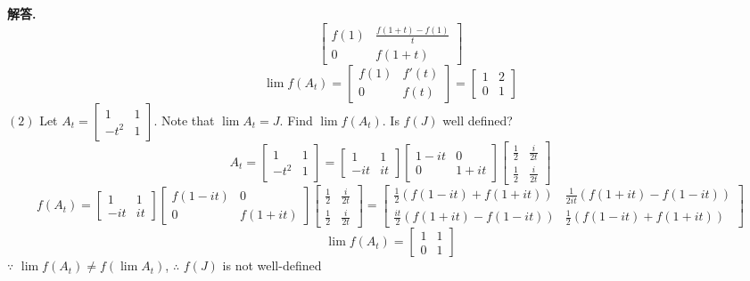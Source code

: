 \documentclass[12pt, a4paper, oneside]{article}
\newenvironment{solution}{\par\noindent\textbf{解答. }}{\par}
\begin{document}
\begin{CJK}{UTF8}{gbsn}
\begin{solution}
$$\begin{bmatrix}
        f(1) & \frac{f(1+t) - f(1)}{t} \\ 0 & f(1 + t)
      \end{bmatrix}
    $$
    $$
      \lim{f(A_t)} = \begin{bmatrix}
        f(1) & f'(t) \\ 0 & f(t)
      \end{bmatrix} = \begin{bmatrix}
        1 & 2 \\ 0 & 1
      \end{bmatrix}
    $$
    $(2)$ Let $A_t = \begin{bmatrix}
      1 & 1 \\ -t^2 & 1
    \end{bmatrix}$. Note that $\lim{A_t} = J$. Find $\lim{f(A_t)}$. Is $f(J)$ well defined? \newline
    $$
      A_t = \begin{bmatrix}
        1 & 1 \\ -t^2 & 1
      \end{bmatrix} = \begin{bmatrix}
        1 & 1 \\ -it & it  
      \end{bmatrix} \begin{bmatrix}
        1 - it & 0 \\ 0 & 1 + it
      \end{bmatrix} \begin{bmatrix}
        \frac{1}{2} & \frac{i}{2t} \\ \frac{1}{2} & \frac{i}{2t}
      \end{bmatrix}
    $$ 
    $$ 
      f(A_t) =  \begin{bmatrix}
        1 & 1 \\ -it & it  
      \end{bmatrix} \begin{bmatrix}
        f(1 - it) & 0 \\ 0 & f(1 + it)
      \end{bmatrix} \begin{bmatrix}
        \frac{1}{2} & \frac{i}{2t} \\ \frac{1}{2} & \frac{i}{2t}
      \end{bmatrix} = \begin{bmatrix}
        \frac{1}{2}(f(1-it) + f(1+it)) & \frac{1}{2it}(f(1+it) - f(1-it)) \\  \frac{it}{2}(f(1+it) - f(1-it)) & \frac{1}{2}(f(1-it) + f(1+it))
      \end{bmatrix}
    $$
    $$
      \lim{f(A_t)} = \begin{bmatrix}
        1 & 1 \\ 0 & 1
      \end{bmatrix}
    $$
    $\because$ $\lim{f(A_t)}\neq f(\lim{A_t})$, $\therefore$ $f(J)$ is not well-defined
\end{solution}


\end{CJK}
\end{document}
